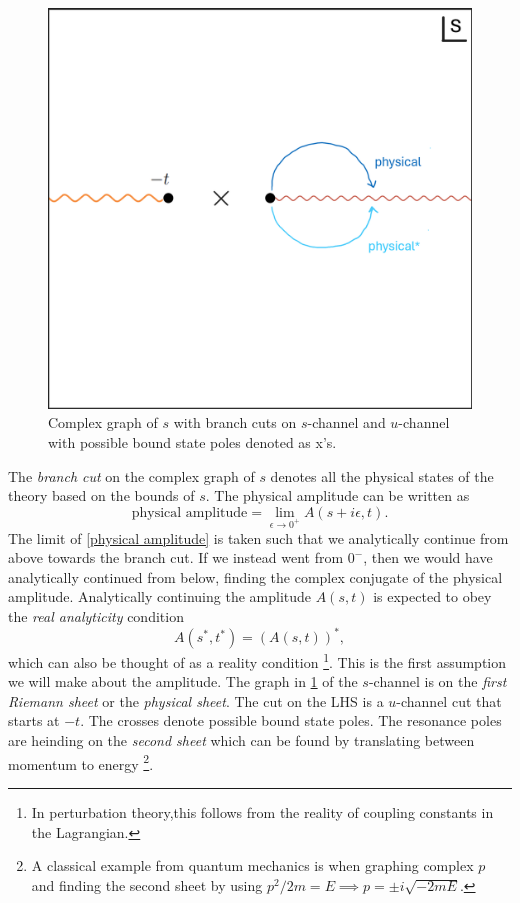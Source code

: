 \documentclass[a4paper,11pt]{article}
\begin{document}
\begin{figure}[h]
    \centering
    \includegraphics[width=0.5\linewidth]{s channel graph.png}
    \caption{Complex graph of $s$ with branch cuts on $s$-channel and $u$-channel with possible bound state poles denoted as x's.}
    \label{Complex graph of s}
\end{figure}
The \textit{branch cut} on the complex graph of $s$ denotes all the physical states of the theory based on the bounds of $s$. The physical amplitude can be written as
\begin{equation}
    \text{physical amplitude} = \lim_{\epsilon\rightarrow 0^+}A(s+i\epsilon,t)\label{physical amplitude}.
\end{equation}
The limit of \eqref{physical amplitude} is taken such that we analytically continue from above towards the branch cut. If we instead went from $0^-$, then we would have analytically continued from below, finding the complex conjugate of the physical amplitude. Analytically continuing the amplitude $A(s,t)$ is expected to obey the \textit{real analyticity} condition
\begin{equation}
    A(s^*,t^*) = (A(s,t))^*\label{reality condition},
\end{equation}
which can also be thought of as a reality condition \footnote{In perturbation theory,this follows from the reality of coupling constants in the Lagrangian.}. This is the first assumption we will make about the amplitude. The graph in \ref{Complex graph of s} of the $s$-channel is on the \textit{first Riemann sheet} or the \textit{physical sheet}. The cut on the LHS is a $u$-channel cut that starts at $-t$. The crosses denote possible bound state poles. The resonance poles are heinding on the \textit{second sheet} which can be found by translating between momentum to energy \footnote{A classical example from quantum mechanics is when graphing complex $p$ and finding the second sheet by using $p^2/2m = E\implies p = \pm i\sqrt{-2mE}$.}. 
\end{document}
